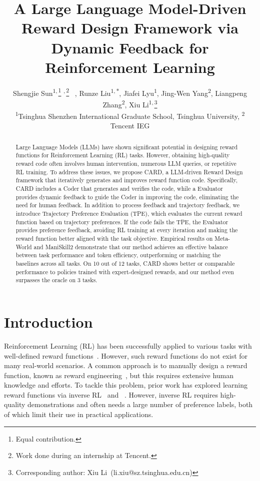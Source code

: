 \documentclass{article}
\title{A Large Language Model-Driven Reward Design Framework via Dynamic Feedback for Reinforcement Learning}
\author{%
\hspace{-0.5em}
Shengjie Sun\textsuperscript{$1,$}\thanks{Equal contribution.} \hspace{0.005pt} \textsuperscript{$,$}\thanks{Work done during an internship at Tencent.} \ , Runze Liu\textsuperscript{$1,*$}, Jiafei Lyu\textsuperscript{$1$}, Jing-Wen Yang\textsuperscript{$2$}, Liangpeng Zhang\textsuperscript{$2$}, Xiu Li\textsuperscript{$1,$}\thanks{Corresponding author: Xiu Li~(li.xiu@sz.tsinghua.edu.cn)} \\
\textsuperscript{$1$}Tsinghua Shenzhen International Graduate School, Tsinghua University, \textsuperscript{$2$}Tencent IEG
}
\theoremstyle{plain}
\theoremstyle{definition}
\theoremstyle{remark}
\begin{document}
\maketitle


\begin{abstract}
Large Language Models (LLMs) have shown significant potential in designing reward functions for Reinforcement Learning (RL) tasks. However, obtaining high-quality reward code often involves human intervention, numerous LLM queries, or repetitive RL training. To address these issues, we propose CARD, a LLM-driven Reward Design framework that iteratively generates and improves reward function code. Specifically, CARD includes a Coder that generates and verifies the code, while a Evaluator provides dynamic feedback to guide the Coder in improving the code, eliminating the need for human feedback. In addition to process feedback and trajectory feedback, we introduce Trajectory Preference Evaluation (TPE), which evaluates the current reward function based on trajectory preferences. If the code fails the TPE, the Evaluator provides preference feedback, avoiding RL training at every iteration and making the reward function better aligned with the task objective. Empirical results on Meta-World and ManiSkill2 demonstrate that our method achieves an effective balance between task performance and token efficiency, outperforming or matching the baselines across all tasks. On 10 out of 12 tasks, CARD shows better or comparable performance to policies trained with expert-designed rewards, and our method even surpasses the oracle on 3 tasks.
\end{abstract}


\section{Introduction}

Reinforcement Learning (RL) has been successfully applied to various tasks with well-defined reward functions~\cite{mnih2015human,silver2016mastering,berner2019dota}. However, such reward functions do not exist for many real-world scenarios. A common approach is to manually design a reward function, known as reward engineering~\cite{laud2004theory,gupta2022unpacking}, but this requires extensive human knowledge and efforts. To tackle this problem, prior work has explored learning reward functions via inverse RL~\cite{ziebart2008maximum,wulfmeier2015maximum,finn2016guided,GAIL,AIRL} and \pbRL~\cite{christiano2017deep,ibarz2018reward,PEBBLE,Meta-Reward-Net}. However, inverse RL requires high-quality demonstrations and \pbRL often needs a large number of preference labels, both of which limit their use in practical applications.
\end{document}
